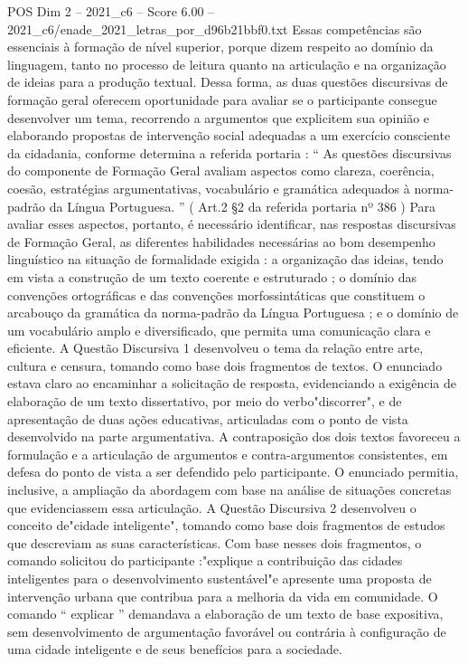 \begin{textsample}{POS Dim 2 – 2021\_c6 – Score 6.00 – 2021\_c6/enade\_2021\_letras\_por\_d96b21bbf0.txt}
Essas competências são essenciais à formação de nível superior, porque dizem respeito ao domínio da linguagem, tanto no processo de leitura quanto na articulação e na organização de ideias para a produção textual.
Dessa forma, as duas questões discursivas de formação geral oferecem oportunidade para avaliar se o participante consegue desenvolver um tema, recorrendo a argumentos que explicitem sua opinião e elaborando propostas de intervenção social adequadas a um exercício consciente da cidadania, conforme determina a referida portaria : “ As questões discursivas do componente de Formação Geral avaliam aspectos como clareza, coerência, coesão, estratégias argumentativas, vocabulário e gramática adequados à norma-padrão da Língua Portuguesa. ” ( Art.2 §2 da referida portaria nº 386 ) Para avaliar esses aspectos, portanto, é necessário identificar, nas respostas discursivas de Formação Geral, as diferentes habilidades necessárias ao bom desempenho linguístico na situação de formalidade exigida : a organização das ideias, tendo em vista a construção de um texto coerente e estruturado ; o domínio das convenções ortográficas e das convenções morfossintáticas que constituem o arcabouço da gramática da norma-padrão da Língua Portuguesa ; e o domínio de um vocabulário amplo e diversificado, que permita uma comunicação clara e eficiente.
A Questão Discursiva 1 desenvolveu o tema da relação entre arte, cultura e censura, tomando como base dois fragmentos de textos.
O enunciado estava claro ao encaminhar a solicitação de resposta, evidenciando a exigência de elaboração de um texto dissertativo, por meio do verbo"discorrer", e de apresentação de duas ações educativas, articuladas com o ponto de vista desenvolvido na parte argumentativa.
A contraposição dos dois textos favoreceu a formulação e a articulação de argumentos e contra-argumentos consistentes, em defesa do ponto de vista a ser defendido pelo participante.
O enunciado permitia, inclusive, a ampliação da abordagem com base na análise de situações concretas que evidenciassem essa articulação.
A Questão Discursiva 2 desenvolveu o conceito de"cidade inteligente", tomando como base dois fragmentos de estudos que descreviam as suas características.
Com base nesses dois fragmentos, o comando solicitou do participante :"explique a contribuição das cidades inteligentes para o desenvolvimento sustentável"e apresente uma proposta de intervenção urbana que contribua para a melhoria da vida em comunidade.
O comando “ explicar ” demandava a elaboração de um texto de base expositiva, sem desenvolvimento de argumentação favorável ou contrária à configuração de uma cidade inteligente e de seus benefícios para a sociedade.

\end{textsample}
